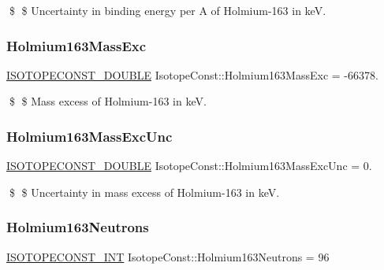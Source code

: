 \$ \$ Uncertainty in binding energy per A of Holmium-\/163 in keV. \mbox{\label{group___isotope_const-_holmium-_ho163_gab488246a4c624e7f7ef2ad326f2f2139}} 
\subsubsection{\texorpdfstring{Holmium163\+Mass\+Exc}{Holmium163MassExc}}
{\footnotesize\ttfamily \mbox{\hyperlink{group___isotope_const-_macros_ga8f45a7272ce02c0b4c65c44636ed719a}{I\+S\+O\+T\+O\+P\+E\+C\+O\+N\+S\+T\+\_\+\+D\+O\+U\+B\+LE}} Isotope\+Const\+::\+Holmium163\+Mass\+Exc = -\/66378.}

\$ \$ Mass excess of Holmium-\/163 in keV. \mbox{\label{group___isotope_const-_holmium-_ho163_gabdd592a97084e3bbf3ead5ec9bc247b6}} 
\subsubsection{\texorpdfstring{Holmium163\+Mass\+Exc\+Unc}{Holmium163MassExcUnc}}
{\footnotesize\ttfamily \mbox{\hyperlink{group___isotope_const-_macros_ga8f45a7272ce02c0b4c65c44636ed719a}{I\+S\+O\+T\+O\+P\+E\+C\+O\+N\+S\+T\+\_\+\+D\+O\+U\+B\+LE}} Isotope\+Const\+::\+Holmium163\+Mass\+Exc\+Unc = 0.}

\$ \$ Uncertainty in mass excess of Holmium-\/163 in keV. \mbox{\label{group___isotope_const-_holmium-_ho163_gafb8da376503576f9276eef592986340f}} 
\subsubsection{\texorpdfstring{Holmium163\+Neutrons}{Holmium163Neutrons}}
{\footnotesize\ttfamily \mbox{\hyperlink{group___isotope_const-_macros_ga5f18360b3e99483a35c32d789e62621c}{I\+S\+O\+T\+O\+P\+E\+C\+O\+N\+S\+T\+\_\+\+I\+NT}} Isotope\+Const\+::\+Holmium163\+Neutrons = 96}

